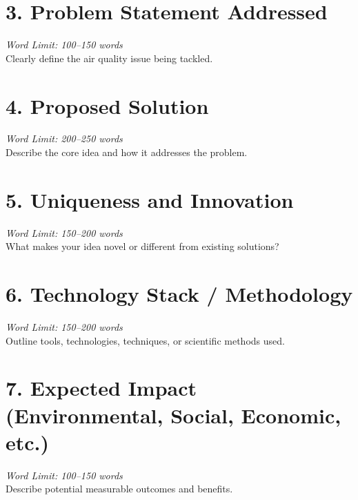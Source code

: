 \documentclass[12pt, a4paper]{article}
\begin{document}
	\vspace{0.8cm}
	
	\section*{\textbf{3. Problem Statement Addressed}}
	\textit{Word Limit: 100–150 words}\\
	Clearly define the air quality issue being tackled.
	
	\vspace{0.8cm}
	
	\section*{\textbf{4. Proposed Solution}}
	\textit{Word Limit: 200–250 words}\\
	Describe the core idea and how it addresses the problem.
	
	\vspace{0.8cm}
	
	\section*{\textbf{5. Uniqueness and Innovation}}
	\textit{Word Limit: 150–200 words}\\
	What makes your idea novel or different from existing solutions?
	
	\vspace{0.8cm}
	
	\section*{\textbf{6. Technology Stack / Methodology}}
	\textit{Word Limit: 150–200 words}\\
	Outline tools, technologies, techniques, or scientific methods used.
	
	\vspace{0.8cm}
	
	\section*{\textbf{7. Expected Impact (Environmental, Social, Economic, etc.)}}
	\textit{Word Limit: 100–150 words}\\
	Describe potential measurable outcomes and benefits.
	
\end{document}
